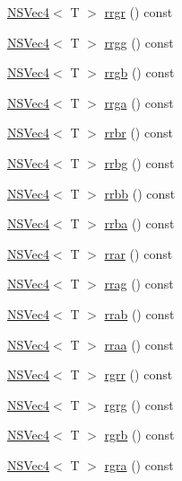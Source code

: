 \begin{DoxyCompactItemize}
\item 
\hyperlink{structNSVec4}{N\-S\-Vec4}$<$ T $>$ \hyperlink{structNSVec4_a3e6de91f365eb391d576161c7cc40028}{rrgr} () const 
\item 
\hyperlink{structNSVec4}{N\-S\-Vec4}$<$ T $>$ \hyperlink{structNSVec4_ae9e8a6d43b89defcfb34ff390b066174}{rrgg} () const 
\item 
\hyperlink{structNSVec4}{N\-S\-Vec4}$<$ T $>$ \hyperlink{structNSVec4_a077edf57dc3dec76123ca745aa667d34}{rrgb} () const 
\item 
\hyperlink{structNSVec4}{N\-S\-Vec4}$<$ T $>$ \hyperlink{structNSVec4_a3361599839c7ba51dfdc9e39ea5f1d37}{rrga} () const 
\item 
\hyperlink{structNSVec4}{N\-S\-Vec4}$<$ T $>$ \hyperlink{structNSVec4_ae0a62ce1246199daea71825c5ed9bc2a}{rrbr} () const 
\item 
\hyperlink{structNSVec4}{N\-S\-Vec4}$<$ T $>$ \hyperlink{structNSVec4_a3cd3d0e454a29791ca1b988d35b4f029}{rrbg} () const 
\item 
\hyperlink{structNSVec4}{N\-S\-Vec4}$<$ T $>$ \hyperlink{structNSVec4_aa9ed496e7d3c663c60cb09fa14a30175}{rrbb} () const 
\item 
\hyperlink{structNSVec4}{N\-S\-Vec4}$<$ T $>$ \hyperlink{structNSVec4_af9fe9f3bee6108dcd77a07c00f0def56}{rrba} () const 
\item 
\hyperlink{structNSVec4}{N\-S\-Vec4}$<$ T $>$ \hyperlink{structNSVec4_a3088d42de49e68cd9f2a60d3ccf96972}{rrar} () const 
\item 
\hyperlink{structNSVec4}{N\-S\-Vec4}$<$ T $>$ \hyperlink{structNSVec4_acd9996fd9a9f2da99ddec98c5bd419aa}{rrag} () const 
\item 
\hyperlink{structNSVec4}{N\-S\-Vec4}$<$ T $>$ \hyperlink{structNSVec4_ae07ad7d7007b782f4e3d09a1429aab03}{rrab} () const 
\item 
\hyperlink{structNSVec4}{N\-S\-Vec4}$<$ T $>$ \hyperlink{structNSVec4_a57732b12d036e6c3e9fc9762d45532f9}{rraa} () const 
\item 
\hyperlink{structNSVec4}{N\-S\-Vec4}$<$ T $>$ \hyperlink{structNSVec4_a8f646cab4367ad2001d5859909b5a315}{rgrr} () const 
\item 
\hyperlink{structNSVec4}{N\-S\-Vec4}$<$ T $>$ \hyperlink{structNSVec4_a75336d654c9abb446bc331c27b0a9de0}{rgrg} () const 
\item 
\hyperlink{structNSVec4}{N\-S\-Vec4}$<$ T $>$ \hyperlink{structNSVec4_a767cd1f604b7d86d4b0d5d08e6fb76e7}{rgrb} () const 
\item 
\hyperlink{structNSVec4}{N\-S\-Vec4}$<$ T $>$ \hyperlink{structNSVec4_a046b8b508ce768105ccd94b6e3ad5044}{rgra} () const 

\end{DoxyCompactItemize}
